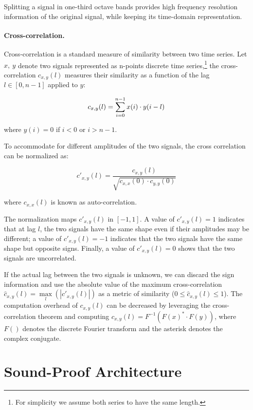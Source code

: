 Splitting a signal in one-third octave bands provides high frequency resolution information of the original signal, while keeping its time-domain representation.

\paragraph{Cross-correlation.}
Cross-correlation is a standard measure of similarity between two time series.
Let $x,\ y$ denote two signals represented as n-points discrete time series,\footnote{For simplicity we assume both series to have the same length.} the cross-correlation $c_{x,y}(l)$ measures their similarity as a function of the lag $l\in[0,n-1]$ applied to $y$:

$$
c_{x,y}(l)= \sum_{i=0}^{n-1}x(i)\cdot y(i-l)\\
$$

where $y(i)=0$ if $i<0$ or $i>n-1$.

To accommodate for different amplitudes of the two signals, the cross correlation can be normalized as:

$$
c'_{x,y}(l)=\frac{c_{x,y}(l)}{\sqrt{c_{x,x}(0)\cdot c_{y,y}(0)}}
$$

where $c_{x,x}(l)$ is known as auto-correlation.

The normalization maps $c'_{x,y}(l)$ in $[-1,1]$.
A value of $c'_{x,y}(l)=1$ indicates that at lag $l$, the two signals have the same shape even if their  amplitudes may be different;
a value of $c'_{x,y}(l)=-1$ indicates that the two signals have the same shape but opposite signs.
Finally, a value of $c'_{x,y}(l)=0$ shows that the two signals are uncorrelated.

If the actual lag between the two signals is unknown, we can discard the sign information and use the absolute value
of the maximum cross-correlation $\hat{c}_{x,y}(l)=\underset{l}{\operatorname{max}}(|c'_{x,y}(l)|)$
as a metric of similarity ($0\leq \hat{c}_{x,y}(l)\leq 1$).
The computation overhead of $c_{x,y}(l)$ can be decreased by leveraging the cross-correlation theorem
and computing $c_{x,y}(l)= F^{-1}(F(x)^* \cdot F(y))$, where $F()$ denotes the discrete Fourier transform and the asterisk denotes the complex conjugate.

\section{Sound-Proof Architecture}
\label{sec:ps_sp_architecture}


